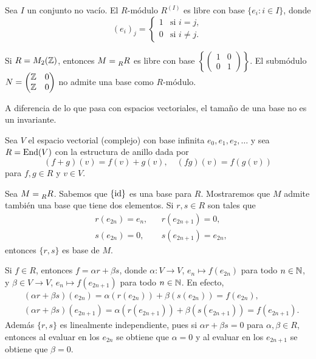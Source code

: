 \begin{example}
Sea $I$ un conjunto no vacío. El $R$-módulo $R^{(I)}$ es libre con base $\{e_i:i\in I\}$, donde 
\[
(e_i)_j=\begin{cases}
	1 & \text{si $i=j$},\\
	0 & \text{si $i\ne j$.}
	\end{cases}	
\]
\end{example}

\begin{example}
Si $R=M_2(\mathbb{Z})$, entonces $M=\prescript{}{R}R$ es libre con base $\left\{\begin{pmatrix}	1&0\\0&1\end{pmatrix}\right\}$. El submódulo
$N=\begin{pmatrix}\mathbb{Z}&0\\\mathbb{Z}&0\end{pmatrix}$ no admite una base como $R$-módulo.	
\end{example}

A diferencia de lo que pasa con espacios vectoriales, el tamaño de una base
no es un invariante. 

\begin{example}
Sea $V$ el espacio vectorial (complejo) con base infinita $e_0,e_1,e_2,\dots$ y sea $R=\operatorname{End}(V)$ con la estructura
de anillo dada por 
\[
(f+g)(v)=f(v)+g(v),\quad
(fg)(v)=f(g(v))
\]
para $f,g\in R$ y $v\in V$. 

Sea $M=\prescript{}{R}R$. 
Sabemos que $\{\operatorname{id}\}$ es una base para $R$.  
Mostraremos que $M$ admite también una base que tiene dos elementos.  
Si $r,s\in R$ son tales que
\begin{align*}
&r(e_{2n})=e_n, && r(e_{2n+1})=0,\\
&s(e_{2n})=0,&& s(e_{2n+1})=e_{2n},
\end{align*}
entonces $\{r,s\}$ es base de $M$. 

Si $f\in R$, entonces
$f=\alpha r+\beta s$, donde $\alpha\colon V\to V$, $e_n\mapsto f(e_{2n})$ para todo $n\in\mathbb{N}$, y $\beta\in V\to V$, $e_n\mapsto f(e_{2n+1})$ para todo $n\in\mathbb{N}$. En efecto,
\begin{align*}
&(\alpha r+\beta s)(e_{2n})=\alpha(r(e_{2n}))+\beta(s(e_{2n}))=f(e_{2n}),\\
&(\alpha r+\beta s)(e_{2n+1})=\alpha(r(e_{2n+1}))+\beta(s(e_{2n+1}))=f(e_{2n+1}).
\end{align*}
Además $\{r,s\}$ es linealmente independiente, pues si $\alpha r+\beta s=0$ para $\alpha,\beta\in R$, entonces al evaluar 
en los $e_{2n}$ se obtiene que $\alpha=0$ y al evaluar en los $e_{2n+1}$ se obtiene que $\beta=0$.   
\end{example} 

